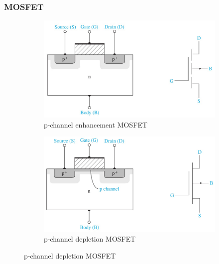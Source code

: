 \documentclass{beamer}
\begin{document}
    \begin{frame} \frametitle{MOSFET}
        \begin{figure}[H]
            \centering
            \begin{subfigure}[t]{0.45\linewidth}
                \centering
                \includegraphics[width=0.9\linewidth]{PMOS-enhancement.jpg}
                \caption{p-channel enhancement MOSFET}
                \label{subfig:PMOS-enhancement.jpg}
            \end{subfigure}
            \begin{subfigure}[t]{0.45\linewidth}
                \centering
                \includegraphics[width=0.9\linewidth]{PMOS-depletion.jpg}
                \caption{p-channel depletion MOSFET}
                \label{subfig:PMOS-depletion.jpg}
            \end{subfigure}
        \end{figure}
    \end{frame}
\end{document}
